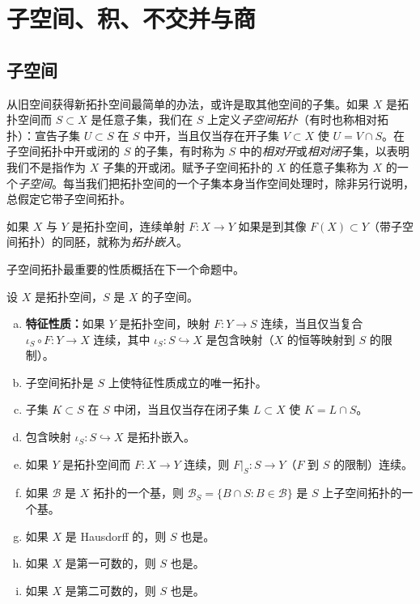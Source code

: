 \documentclass[../../main.tex]{subfiles}
\begin{document}
\section{子空间、积、不交并与商}\label{section:appA-subspaces-products-quotients}

\subsection*{子空间}

从旧空间获得新拓扑空间最简单的办法，或许是取其他空间的子集。如果 $X$ 是拓扑空间而 $S\subset X$ 是任意子集，我们在 $S$ 上定义\emph{子空间拓扑}（有时也称相对拓扑）：宣告子集 $U\subset S$ 在 $S$ 中开，当且仅当存在开子集 $V\subset X$ 使 $U=V\cap S$。在子空间拓扑中开或闭的 $S$ 的子集，有时称为 $S$ 中的\emph{相对开}或\emph{相对闭}子集，以表明我们不是指作为 $X$ 子集的开或闭。赋予子空间拓扑的 $X$ 的任意子集称为 $X$ 的一个\emph{子空间}。每当我们把拓扑空间的一个子集本身当作空间处理时，除非另行说明，总假定它带子空间拓扑。

如果 $X$ 与 $Y$ 是拓扑空间，连续单射 $F:X\to Y$ 如果是到其像 $F(X)\subset Y$（带子空间拓扑）的同胚，就称为\emph{拓扑嵌入}。

子空间拓扑最重要的性质概括在下一个命题中。

\begin{proposition}[子空间拓扑的性质]\label{proposition:appA-subspace-properties}
设 $X$ 是拓扑空间，$S$ 是 $X$ 的子空间。
\begin{enumerate}[(a)]
\item \textbf{特征性质：}如果 $Y$ 是拓扑空间，映射 $F:Y\to S$ 连续，当且仅当复合 $\iota_S\circ F:Y\to X$ 连续，其中 $\iota_S:S\hookrightarrow X$ 是包含映射（$X$ 的恒等映射到 $S$ 的限制）。
\item 子空间拓扑是 $S$ 上使特征性质成立的唯一拓扑。
\item 子集 $K\subset S$ 在 $S$ 中闭，当且仅当存在闭子集 $L\subset X$ 使 $K=L\cap S$。
\item 包含映射 $\iota_S:S\hookrightarrow X$ 是拓扑嵌入。
\item 如果 $Y$ 是拓扑空间而 $F:X\to Y$ 连续，则 $F|_S:S\to Y$（$F$ 到 $S$ 的限制）连续。
\item 如果 $\mathcal B$ 是 $X$ 拓扑的一个基，则 $\mathcal B_S=\{B\cap S:B\in\mathcal B\}$ 是 $S$ 上子空间拓扑的一个基。
\item 如果 $X$ 是 Hausdorff 的，则 $S$ 也是。
\item 如果 $X$ 是第一可数的，则 $S$ 也是。
\item 如果 $X$ 是第二可数的，则 $S$ 也是。
\end{enumerate}
\end{proposition}
\end{document}
